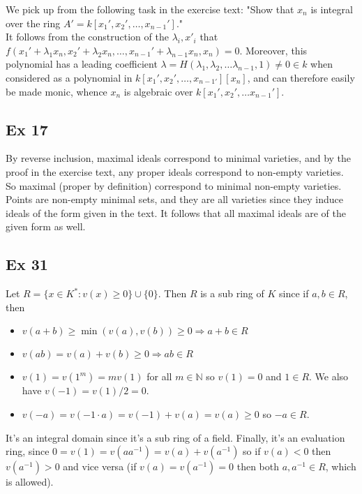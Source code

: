 \documentclass{article}
\theoremstyle{definition}
\newcommand{\N}{\mathbb{N}}
\begin{document}
We pick up from the following task in the exercise text: "Show that $x_n$ is
integral over the ring $A' = k[x_1', x_2', \ldots, x_{n-1}']$." \\

It follows from the construction of the $\lambda_i, x'_i$ that $f(x_1' +
\lambda_1 x_n, x_2' + \lambda_2 x_n, \ldots, x_{n-1}' + \lambda_{n-1} x_n, x_n)
= 0$. Moreover, this polynomial has a leading coefficient $\lambda =
H(\lambda_1, \lambda_2, \ldots \lambda_{n-1}, 1) \not = 0 \in k$ when
considered as a polynomial in $k[x_1', x_2', \ldots, x_{n-1'}][x_n]$,
and can therefore easily be made monic, whence $x_n$ is algebraic over 
$k[x_1', x_2', \ldots x_{n-1}']$.

\subsection*{Ex 17}

By reverse inclusion, maximal ideals correspond to minimal varieties, and by
the proof in the exercise text, any proper ideals correspond to non-empty
varieties. So maximal (proper by definition) correspond to minimal non-empty
varieties. Points are non-empty minimal sets, and they are all varieties since
they induce ideals of the form given in the text. It follows that all maximal
ideals are of the given form as well.

\subsection*{Ex 31}
Let $R = \{x \in K^{*} : v(x) \geq 0 \} \cup \{0\}$. Then $R$ is a sub ring of
$K$ since if $a, b \in R$, then
\begin{itemize}
	\item $v(a + b) \geq \min(v(a), v(b)) \geq 0 \Rightarrow a + b \in R$
	\item $v(ab) = v(a) + v(b) \geq 0 \Rightarrow ab \in R$ 
	\item $v(1) = v(1^{m}) = mv(1)$ for all $m \in \N$ so $v(1) = 0$
		and $1 \in R$. We also have $v(-1) = v(1)/2 = 0$.
	\item $v(-a) = v(-1 \cdot a) = v(-1) + v(a) = v(a) \geq 0$ so $-a \in R$.
\end{itemize}

It's an integral domain since it's a sub ring of a field. Finally, it's an
evaluation ring, since $0 = v(1) = v(a a^{-1}) = v(a) + v(a^{-1})$ so if $v(a)
< 0$ then $v(a^{-1}) > 0$ and vice versa (if $v(a) = v(a^{-1}) = 0$ then both
$a, a^{-1} \in R$, which is allowed).
\end{document}
